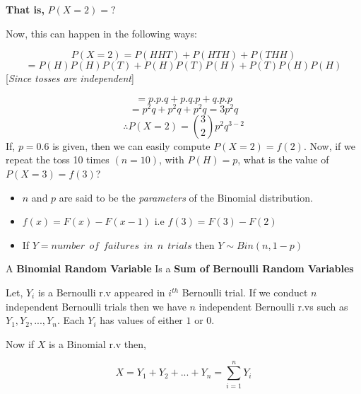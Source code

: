 \documentclass[
  11pt,
  letterpaper,
  DIV=11,
  numbers=noendperiod]{scrreprt}
\begin{document}
\textbf{That is,} \(P(X=2)=?\)

Now, this can happen in the following ways:

\[P(X=2)=P(HHT)+P(HTH)+P(THH)\]
\[=P(H)P(H)P(T)+P(H)P(T)P(H)+P(T)P(H)P(H)\] {[}\emph{Since tosses are
independent}{]}

\[=p.p.q+p.q.p+q.p.p\] \[=p^2 q+p^2 q+p^2 q=3p^2 q\]
\[\therefore P(X=2)=\binom{3}{2}p^2q^{3-2}\] If, \(p=0.6\) is given,
then we can easily compute \(P(X=2)=f(2)\). Now, if we repeat the toss
10 times \((n=10)\), with \(P(H)=p\), what is the value of
\(P(X=3)=f(3)\)?

\begin{tcolorbox}[enhanced jigsaw, bottomrule=.15mm, toprule=.15mm, title=\textcolor{quarto-callout-note-color}{\faInfo}\hspace{0.5em}{Note}, bottomtitle=1mm, colframe=quarto-callout-note-color-frame, coltitle=black, rightrule=.15mm, toptitle=1mm, colbacktitle=quarto-callout-note-color!10!white, titlerule=0mm, breakable, arc=.35mm, leftrule=.75mm, opacitybacktitle=0.6, opacityback=0, colback=white, left=2mm]

\begin{itemize}
\item
  \(n\) and \(p\) are said to be the \emph{parameters} of the Binomial
  distribution.
\item
  \(f(x)=F(x)-F(x-1)\) i.e \(f(3)=F(3)-F(2)\)
\item
  If \(Y=number \ \ of \ \ failures\ \ in \ \ n\ \ trials\) then
  \(Y\sim Bin(n,1-p)\)
\end{itemize}

\end{tcolorbox}

\begin{tcolorbox}[enhanced jigsaw, bottomrule=.15mm, toprule=.15mm, title=\textcolor{quarto-callout-note-color}{\faInfo}\hspace{0.5em}{Relation between Bernoulli r.v and Binomial r.v}, bottomtitle=1mm, colframe=quarto-callout-note-color-frame, coltitle=black, rightrule=.15mm, toptitle=1mm, colbacktitle=quarto-callout-note-color!10!white, titlerule=0mm, breakable, arc=.35mm, leftrule=.75mm, opacitybacktitle=0.6, opacityback=0, colback=white, left=2mm]

A \textbf{Binomial Random Variable} Is a \textbf{Sum of Bernoulli Random
Variables}

Let, \(Y_i\) is a Bernoulli r.v appeared in \(i^{th}\) Bernoulli trial.
If we conduct \(n\) independent Bernoulli trials then we have \(n\)
independent Bernoulli r.vs such as \(Y_1, Y_2, ..., Y_n\). Each \(Y_i\)
has values of either \(1\) or \(0\).

Now if \(X\) is a Binomial r.v then,

\[ X=Y_1+Y_2+...+Y_n =\sum_{i=1}^n Y_i \]

\end{tcolorbox}
\end{document}
